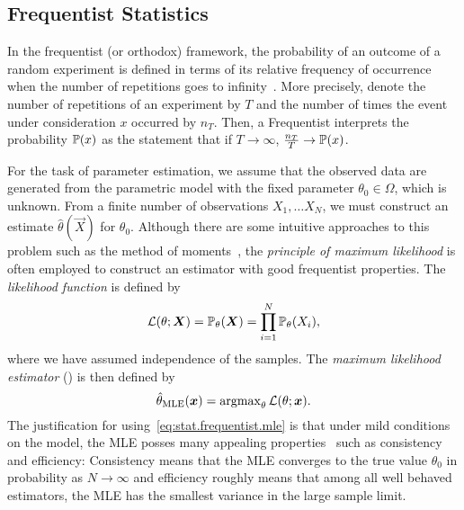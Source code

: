 \subsection{Frequentist Statistics}
\label{sub:stat.frequentist}

In the frequentist (or orthodox) framework, the probability of an outcome of a random experiment is defined in terms of its relative frequency of occurrence when the number of repetitions goes to infinity~\cite{Keynes_2007_Treatise,Kiefer_2012_Introduction}.
More precisely, denote the number of repetitions of an experiment by $T$ and the number of times the event under consideration $x$ occurred by $n_T$.
Then, a Frequentist interprets the probability $\mathbb{P}(x)$ as the statement that if $T \to \infty$, $\frac{n_T}{T} \to \mathbb{P}(x)$.

For the task of parameter estimation, we assume that the observed data are generated from the parametric model with the fixed  parameter $\theta_0 \in \Omega$, which is unknown.
From a finite number of observations $X_1, \ldots X_N$, we must construct an estimate $\hat\theta(\vec X)$ for $\theta_0$.
Although there are some intuitive approaches to this problem such as the method of moments~\cite[Sec.\ 9.2]{Wasserman_2013_All}, the \emph{principle of maximum likelihood} is often employed to construct an estimator with good frequentist properties.
The \emph{likelihood function} is defined by
\[
  \mathcal{L}(\theta; {\boldsymbol{X}}) = \mathbb{P}_\theta({\boldsymbol{X}}) = \prod_{i=1}^N \mathbb{P}_\theta(X_i),
  \label{eq:stat.frequentist.likelihood_function}
\]
where we have assumed independence of the samples.
The \emph{maximum likelihood estimator} () is then defined by
\[
  \hat{\theta}_\mathrm{MLE}({\boldsymbol{x}}) = \operatorname{argmax}_\theta \mathcal{L}(\theta; {\boldsymbol{x}}).
  \label{eq:stat.frequentist.mle}
\]
The justification for using~\eqref{eq:stat.frequentist.mle} is that under mild conditions on the model, the MLE posses many appealing properties~\cite[Sec.\ 9.4]{Wasserman_2013_All} such as consistency and efficiency:
Consistency means that the MLE converges to the true value $\theta_0$ in probability as $N \to \infty$ and efficiency roughly means that among all well behaved estimators, the MLE has the smallest variance in the large sample limit.

